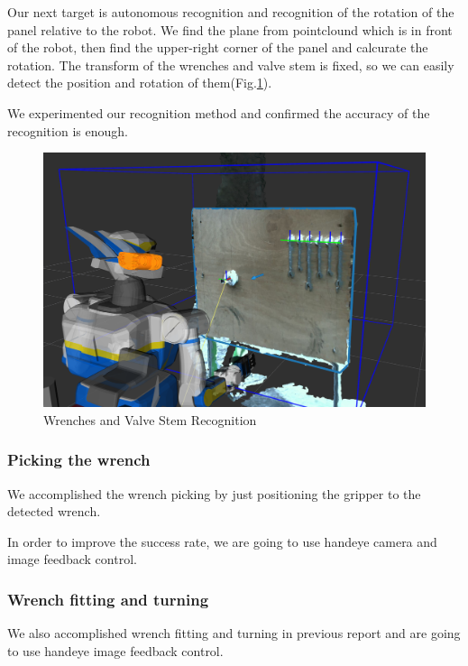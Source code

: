 Our next target is autonomous recognition and recognition of the rotation
of the panel relative to the robot.
We find the plane from pointclound which is in front of the robot, then find the upper-right corner of the panel and calcurate the rotation.
The transform of the wrenches and valve stem is fixed, so we can easily detect the position and rotation of them(Fig.\ref{fig: task2_object-recognition}).

We experimented our recognition method and confirmed the accuracy of the recognition is enough.

\begin{figure}[htb]
  \begin{center}
    \includegraphics[width=0.80\columnwidth]{sections/task2/images/wrench_valve_recog.png}
    \caption{Wrenches and Valve Stem Recognition}
    \label{fig: task2_object-recognition}
  \end{center}
\end{figure}

\subsubsection{Picking the wrench}
We accomplished the wrench picking by just positioning the gripper to the detected wrench.

In order to improve the success rate, we are going to use handeye camera and image feedback control.


\subsubsection{Wrench fitting and turning}
We also accomplished wrench fitting and turning in previous report and are going to use handeye image feedback control.
